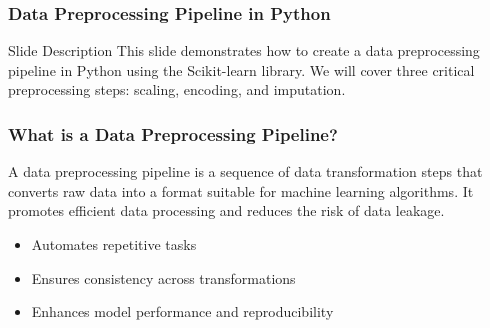 \documentclass[aspectratio=169]{beamer}
\begin{document}
\begin{frame}
    \frametitle{Data Preprocessing Pipeline in Python}
    \begin{block}{Slide Description}
        This slide demonstrates how to create a data preprocessing pipeline in Python using the Scikit-learn library. We will cover three critical preprocessing steps: scaling, encoding, and imputation.
    \end{block}
\end{frame}

\begin{frame}
    \frametitle{What is a Data Preprocessing Pipeline?}
    A data preprocessing pipeline is a sequence of data transformation steps that converts raw data into a format suitable for machine learning algorithms. It promotes efficient data processing and reduces the risk of data leakage.

    \begin{itemize}
        \item Automates repetitive tasks
        \item Ensures consistency across transformations
        \item Enhances model performance and reproducibility
    \end{itemize}
\end{frame}
\end{document}
